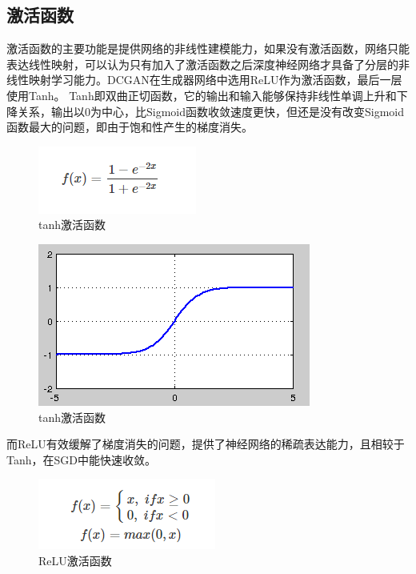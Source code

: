 \documentclass[
  hyperref, a4paper]{ctexart}
\begin{document}
\hypertarget{ux6fc0ux6d3bux51fdux6570}{%
\subsection{激活函数}\label{ux6fc0ux6d3bux51fdux6570}}

激活函数的主要功能是提供网络的非线性建模能力，如果没有激活函数，网络只能表达线性映射，可以认为只有加入了激活函数之后深度神经网络才具备了分层的非线性映射学习能力。DCGAN在生成器网络中选用ReLU作为激活函数，最后一层使用Tanh。
Tanh即双曲正切函数，它的输出和输入能够保持非线性单调上升和下降关系，输出以0为中心，比Sigmoid函数收敛速度更快，但还是没有改变Sigmoid函数最大的问题，即由于饱和性产生的梯度消失。

\begin{figure}
\centering
\includegraphics{./12.png}
\caption{tanh激活函数}
\end{figure}

\begin{figure}
\centering
\includegraphics{./13.jpg}
\caption{tanh激活函数}
\end{figure}

而ReLU有效缓解了梯度消失的问题，提供了神经网络的稀疏表达能力，且相较于Tanh，在SGD中能快速收敛。

\begin{figure}
\centering
\includegraphics{./14.png}
\caption{ReLU激活函数}
\end{figure}
\end{document}
